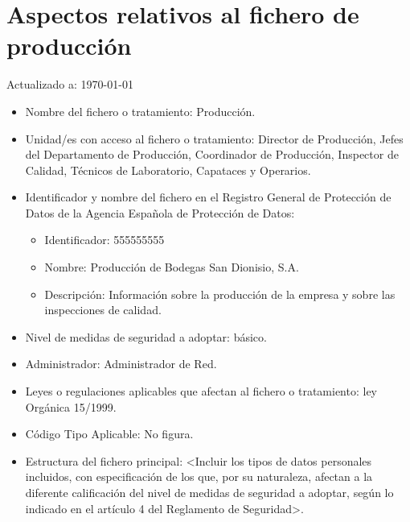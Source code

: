 \documentclass[a4paper,11pt,bibtotoc,noliststotoc]{scrbook}
\newcommand{\laorganizacion}{Bodegas San Dionisio, S.A.}
\begin{document}
\section{Aspectos relativos al fichero de producción}


Actualizado a: \today

\begin{itemize}
\item Nombre del fichero o tratamiento: Producción.

\item Unidad/es con acceso al fichero o tratamiento: Director de Producción, Jefes del Departamento de Producción, Coordinador de Producción, Inspector de Calidad, Técnicos de Laboratorio, Capataces y Operarios.

\item Identificador y nombre del fichero en el Registro General de Protección de Datos de la Agencia Española de Protección de Datos: 
	\begin{itemize}
	\item Identificador: 555555555
	\item Nombre: Producción de \laorganizacion
	\item Descripción: Información sobre la producción de la empresa y sobre las inspecciones de calidad.
	\end{itemize}

\item Nivel de medidas de seguridad a adoptar: básico.

\item Administrador: Administrador de Red.

\item Leyes o regulaciones aplicables que afectan al fichero o tratamiento: ley Orgánica 15/1999.

\item Código Tipo Aplicable: No figura.

\item Estructura del fichero principal: <Incluir los tipos de datos personales incluidos, con especificación de los que, por su naturaleza, afectan a la diferente calificación del nivel de medidas de seguridad a adoptar, según lo indicado en el artículo 4 del Reglamento de Seguridad>.


\end{itemize}
\end{document}
